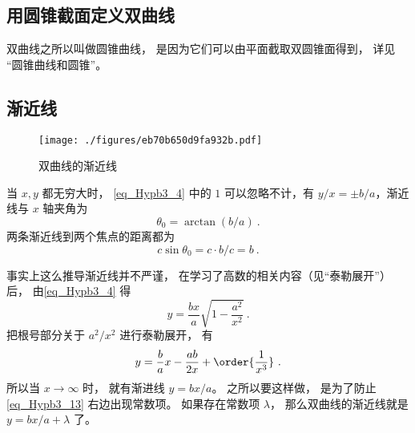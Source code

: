 \subsection{用圆锥截面定义双曲线}
双曲线之所以叫做圆锥曲线， 是因为它们可以由平面截取双圆锥面得到， 详见 “圆锥曲线和圆锥”。

\subsection{渐近线}
\begin{figure}[ht]
\centering
\texttt{[image: ./figures/eb70b650d9fa932b.pdf]}
\caption{双曲线的渐近线} \label{fig_Hypb3_1}
\end{figure}

当 $x,y$ 都无穷大时， \autoref{eq_Hypb3_4} 中的 $1$ 可以忽略不计，有 $y/x = \pm b/a$，渐近线与 $x$ 轴夹角为
\begin{equation}\label{eq_Hypb3_1}
\theta_0 = \arctan(b/a)~.
\end{equation}
两条渐近线到两个焦点的距离都为
\begin{equation}\label{eq_Hypb3_11}
c\sin\theta_0 = c\cdot b/c = b~.
\end{equation}


事实上这么推导渐近线并不严谨， 在学习了高数的相关内容（见“泰勒展开”）后， 由\autoref{eq_Hypb3_4} 得
\begin{equation}
y = \frac{bx}{a} \sqrt{1-\frac{a^2}{x^2}}~.
\end{equation}
把根号部分关于 $a^2/x^2$ 进行泰勒展开， 有
\begin{equation}\label{eq_Hypb3_13}
y = \frac ba x - \frac{ab}{2x} + \order{\frac{1}{x^3}}~.
\end{equation}
所以当 $x\to\infty$ 时， 就有渐进线 $y = bx/a$。 之所以要这样做， 是为了防止\autoref{eq_Hypb3_13} 右边出现常数项。 如果存在常数项 $\lambda$， 那么双曲线的渐近线就是 $y = bx/a + \lambda$ 了。











